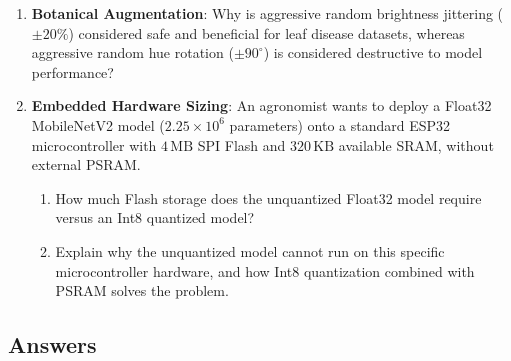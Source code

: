 \begin{checkyourself}
\begin{enumerate}
    \item \textbf{Botanical Augmentation}: Why is aggressive random brightness jittering ($\pm 20\%$) considered safe and beneficial for leaf disease datasets, whereas aggressive random hue rotation ($\pm 90^\circ$) is considered destructive to model performance?
    \item \textbf{Embedded Hardware Sizing}: An agronomist wants to deploy a Float32 MobileNetV2 model ($2.25 \times 10^6$ parameters) onto a standard ESP32 microcontroller with $4\,\text{MB}$ SPI Flash and $320\,\text{KB}$ available SRAM, without external PSRAM.
    \begin{enumerate}
        \item How much Flash storage does the unquantized Float32 model require versus an Int8 quantized model?
        \item Explain why the unquantized model cannot run on this specific microcontroller hardware, and how Int8 quantization combined with PSRAM solves the problem.
    \end{enumerate}
\end{enumerate}
\end{checkyourself}

\subsection*{Answers}

